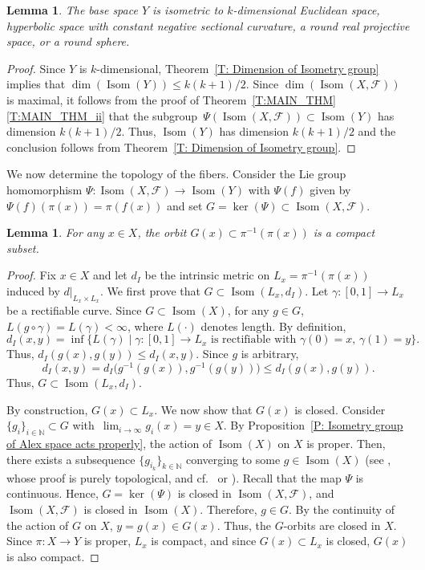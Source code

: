 \documentclass[10pt,a4paper]{amsart}
\numberwithin{equation}{section}
\newtheorem{lem}[thm]{Lemma}
\theoremstyle{definition}
\DeclareMathOperator{\Iso}{Isom}
\newcommand{\N}{\mathbb{N}} %
\newcommand{\fol}{\mathcal{F}}
\begin{document}
\begin{lem}\label{L: equality implies base is a manifold isometric to model spaces}
The base space $Y$ is isometric to $k$-dimensional Euclidean space, hyperbolic space with constant negative sectional curvature, a round real projective space, or a round sphere.
\end{lem}

\begin{proof}
Since $Y$ is $k$-dimensional, Theorem~\ref{T: Dimension of Isometry group} implies that $\dim(\Iso(Y))\leq k(k+1)/2$.
Since $\dim(\Iso(X,\fol))$ is maximal, it follows from the proof of Theorem~\ref{T:MAIN_THM}\,\ref{T:MAIN_THM_ii} that the subgroup~${\Psi(\Iso(X,\fol))\subset \Iso(Y)}$ has dimension $k(k+1)/2$. Thus, $\Iso(Y)$ has dimension $k(k+1)/2$ and the conclusion follows from Theorem~\ref{T: Dimension of Isometry group}.
\end{proof}

We now determine the topology of the fibers. Consider the Lie group homomorphism
$
\Psi\colon  \Iso(X,\fol)\to \Iso(Y)
$
with $\Psi(f)$ given by $\Psi(f)(\pi(x)) = \pi(f(x))$ and set $G=\ker(\Psi)\subset \Iso(X,\fol)$.

\begin{lem}\label{L: fibers contain homogeneous subsets}
For any $x\in X$, the orbit $G(x)\subset \pi^{-1}(\pi(x))$ is a compact subset.
\end{lem}

\begin{proof}Fix $x\in X$ and let $d_I$ be the intrinsic metric on $L_{x}=\pi^{-1}(\pi(x))$ induced by $d|_{L_{x}\times L_{x}}$.
We first prove that $G\subset\Iso(L_{x},d_I)$.
Let $\gamma\colon [0,1]\to L_x$ be a rectifiable curve.
Since $G\subset \Iso(X)$, for any $g\in G$,
$L(g\circ \gamma)=L(\gamma)<\infty$,
where $L(\cdot)$ denotes length.
By definition,
\[
d_I(x,y)=\inf\{L(\gamma)\mid \gamma\colon[0,1]\to L_x \text{ is rectifiable with } \gamma(0)=x,\, \gamma(1)=y\}.
\]
Thus, $d_I(g(x),g(y))\leq d_I(x,y)$. Since $g$ is arbitrary,
\[
d_I(x,y)=d_I\bigl(g^{-1}(g(x)),g^{-1}(g(y))\bigr)\leq d_I(g(x),g(y)).
\]
Thus, $G\subset \Iso(L_{x},d_I)$.

By construction, $G(x)\subset L_{x}$.
We now show that $G(x)$ is closed.
Consider $\{g_i\}_{i\in \N}\subset G$ with~${\lim_{i\to\infty}g_i(x)=y\in X}$.
By Proposition~\ref{P: Isometry group of Alex space acts properly}, the action of $\Iso(X)$ on $X$ is proper. Then, there exists a subsequence $\{g_{i_k}\}_{k\in \N}$ converging to some $g\in \Iso(X)$ (see \cite[Proposition~21.5]{Lee}, whose proof is purely topological, and cf.\ \cite[Proposition~2.2]{CorroKordass2019} or \cite{DiazRamos2008a}).
Recall that the map $\Psi$ is continuous. Hence, $G=\ker(\Psi)$ is closed in $\Iso(X,\fol)$, and $\Iso(X,\fol)$ is closed in $\Iso(X)$.
Therefore, $g\in G$.
By the continuity of the action of $G$ on $X$, $y=g(x)\in G(x)$.
Thus, the $G$-orbits are closed in $X$. Since $\pi\colon X\to Y$ is proper, $L_x$ is compact, and since $G(x)\subset L_x$ is closed, $G(x)$ is also compact.
\end{proof}
\end{document}
